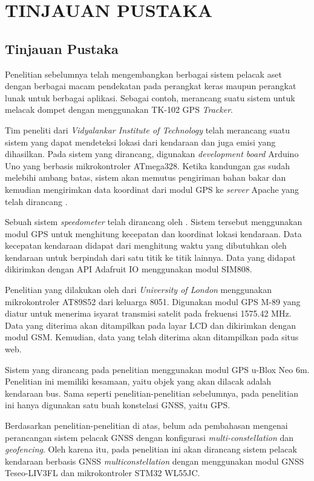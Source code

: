 \chapter{TINJAUAN PUSTAKA}

\section{Tinjauan Pustaka}
Penelitian sebelumnya telah mengembangkan berbagai sistem pelacak aset dengan berbagai macam pendekatan pada perangkat keras maupun perangkat lunak untuk berbagai aplikasi. Sebagai contoh, \cite{Ekhsan2022} merancang suatu sistem untuk melacak dompet dengan menggunakan TK-102 GPS \textit{Tracker}.

Tim peneliti dari \textit{Vidyalankar Institute of Technology} telah merancang suatu sistem yang dapat mendeteksi lokasi dari kendaraan dan juga emisi  yang dihasilkan. Pada sistem yang dirancang, digunakan \textit{development board} Arduino Uno yang berbasis mikrokontroler ATmega328. Ketika kandungan gas  sudah melebihi ambang batas, sistem akan memutus pengiriman bahan bakar dan kemudian mengirimkan data koordinat dari modul GPS ke \textit{server} Apache yang telah dirancang \cite{Asha2022}.

Sebuah sistem \textit{speedometer} telah dirancang oleh \cite{Najmurrokhman2021}. Sistem tersebut menggunakan modul GPS untuk menghitung kecepatan dan koordinat lokasi kendaraan. Data kecepatan kendaraan didapat dari menghitung waktu yang dibutuhkan oleh kendaraan untuk berpindah dari satu titik ke titik lainnya. Data yang didapat dikirimkan dengan API Adafruit IO menggunakan modul SIM808.

Penelitian yang dilakukan oleh \cite{Mukhtar2015} dari \textit{University of London} menggunakan mikrokontroler AT89S52 dari keluarga 8051. Digunakan modul GPS M-89 yang diatur untuk menerima isyarat transmisi satelit pada frekuensi 1575.42 MHz. Data yang diterima akan ditampilkan pada layar LCD dan dikirimkan dengan modul GSM. Kemudian, data yang telah diterima akan ditampilkan pada situs web.

Sistem yang dirancang pada penelitian \cite{Widya2016} menggunakan modul GPS u-Blox Neo 6m. Penelitian ini memiliki kesamaan, yaitu objek yang akan dilacak adalah kendaraan bus. Sama seperti penelitian-penelitian sebelumnya, pada penelitian ini hanya digunakan satu buah konstelasi GNSS, yaitu GPS.

Berdasarkan penelitian-penelitian di atas, belum ada pembahasan mengenai perancangan sistem pelacak GNSS dengan konfigurasi \textit{multi-constellation} dan \textit{geofencing}. Oleh karena itu, pada penelitian ini akan dirancang sistem pelacak kendaraan berbasis GNSS \textit{multiconstellation} dengan menggunakan modul GNSS Teseo-LIV3FL dan mikrokontroler STM32 WL55JC.

